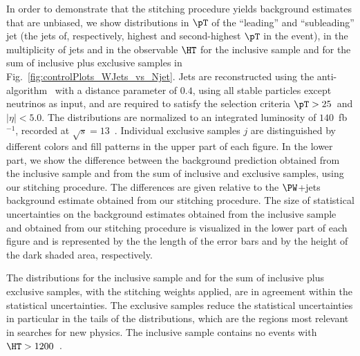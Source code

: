 In order to demonstrate that the stitching procedure yields background estimates that are unbiased,
we show distributions in $\pT$ of the ``leading'' and ``subleading'' jet (the jets of, respectively, highest and second-highest $\pT$ in the event),
in the multiplicity of jets and in the observable $\HT$ 
for the inclusive sample and for the sum of inclusive plus exclusive samples in Fig.~\ref{fig:controlPlots_WJets_vs_Njet}.
Jets are reconstructed using the anti-\kt algorithm~\cite{Cacciari:2008gp,Cacciari:2011ma} with a distance parameter of $0.4$,
using all stable particles except neutrinos as input, and are required to satisfy the selection criteria $\pT > 25$~\GeV and $\vert\eta\vert < 5.0$.
The distributions are normalized to an integrated luminosity of $140$~fb$^{-1}$, recorded at $\sqrt{s}=13$~\TeV.
Individual exclusive samples $j$ are distinguished by different colors and fill patterns in the upper part of each figure.
In the lower part, we show the difference between the background prediction obtained from the inclusive sample and from the sum of inclusive and exclusive samples,
using our stitching procedure.
The differences are given relative to the $\PW$+jets background estimate obtained from our stitching procedure.
The size of statistical uncertainties on the background estimates obtained from the inclusive sample and obtained from our stitching procedure
is visualized in the lower part of each figure and is represented by the the length of the error bars and by the height of the dark shaded area, respectively.

The distributions for the inclusive sample and for the sum of inclusive plus exclusive samples, with the stitching weights applied, are in agreement within the statistical uncertainties.
The exclusive samples reduce the statistical uncertainties in particular in the tails of the distributions,
which are the regions most relevant in searches for new physics.
The inclusive sample contains no events with $\HT > 1200$~\GeV. 

